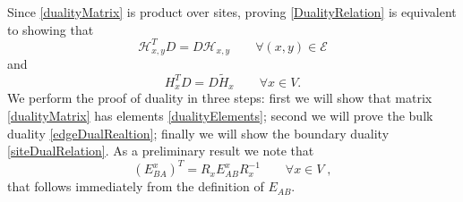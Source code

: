 \documentclass[10pt]{article}
\numberwithin{equation}{section}
\numberwithin{equation}{subsection}
\newcommand{\co}{\;,}
\begin{document}
Since \eqref{dualityMatrix} is product over sites, proving \eqref{DualityRelation} is equivalent to showing that 
\begin{equation}\label{edgeDualRealtion}
    \mathcal{H}_{x,y}^{T}D=D\mathcal{H}_{x,y}\qquad \forall (x,y)\in \mathcal{E}
\end{equation}
and 
\begin{equation}\label{siteDualRelation}
    H_{x}^{T}D=D\widetilde{H}_{x}\qquad \forall x\in V.
\end{equation}
We perform the proof of duality in three steps: first we will show that matrix \eqref{dualityMatrix} has elements \eqref{dualityElements}; second we will prove the bulk duality \eqref{edgeDualRealtion}; finally we will show the boundary duality \eqref{siteDualRelation}. 
As a preliminary result we note that 
\begin{equation}\label{transpositionPropertyR}
(E_{BA}^{x})^{T}=R_{x}E_{AB}^{x}R_{x}^{-1}\qquad \forall x\in V\co
\end{equation} 
that follows immediately from the definition of $E_{AB}$. 
\end{document}
